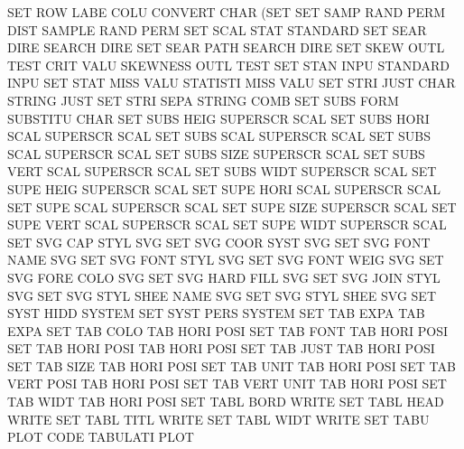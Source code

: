 SET      ROW  LABE COLU                 CONVERT  CHAR (SET
SET      SAMP RAND PERM DIST            SAMPLE   RAND PERM
SET      SCAL STAT                      STANDARD
SET      SEAR DIRE                      SEARCH   DIRE
SET      SEAR PATH                      SEARCH   DIRE
SET      SKEW OUTL TEST CRIT VALU       SKEWNESS OUTL TEST
SET      STAN INPU                      STANDARD INPU
SET      STAT MISS VALU                 STATISTI MISS VALU
SET      STRI JUST CHAR                 STRING   JUST
SET      STRI SEPA                      STRING   COMB
SET      SUBS FORM                      SUBSTITU CHAR
SET      SUBS HEIG                      SUPERSCR SCAL
SET      SUBS HORI SCAL                 SUPERSCR SCAL
SET      SUBS SCAL                      SUPERSCR SCAL
SET      SUBS SCAL                      SUPERSCR SCAL
SET      SUBS SIZE                      SUPERSCR SCAL
SET      SUBS VERT SCAL                 SUPERSCR SCAL
SET      SUBS WIDT                      SUPERSCR SCAL
SET      SUPE HEIG                      SUPERSCR SCAL
SET      SUPE HORI SCAL                 SUPERSCR SCAL
SET      SUPE SCAL                      SUPERSCR SCAL
SET      SUPE SIZE                      SUPERSCR SCAL
SET      SUPE VERT SCAL                 SUPERSCR SCAL
SET      SUPE WIDT                      SUPERSCR SCAL
SET      SVG  CAP  STYL                 SVG
SET      SVG  COOR SYST                 SVG
SET      SVG  FONT NAME                 SVG
SET      SVG  FONT STYL                 SVG
SET      SVG  FONT WEIG                 SVG
SET      SVG  FORE COLO                 SVG
SET      SVG  HARD FILL                 SVG
SET      SVG  JOIN STYL                 SVG
SET      SVG  STYL SHEE NAME            SVG
SET      SVG  STYL SHEE                 SVG
SET      SYST HIDD                      SYSTEM
SET      SYST PERS                      SYSTEM
SET      TAB  EXPA                      TAB      EXPA
SET      TAB  COLO                      TAB HORI POSI
SET      TAB  FONT                      TAB HORI POSI
SET      TAB  HORI POSI                 TAB HORI POSI
SET      TAB  JUST                      TAB HORI POSI
SET      TAB  SIZE                      TAB HORI POSI
SET      TAB  UNIT                      TAB HORI POSI
SET      TAB  VERT POSI                 TAB HORI POSI
SET      TAB  VERT UNIT                 TAB HORI POSI
SET      TAB  WIDT                      TAB HORI POSI
SET      TABL BORD                      WRITE
SET      TABL HEAD                      WRITE
SET      TABL TITL                      WRITE
SET      TABL WIDT                      WRITE
SET      TABU PLOT CODE                 TABULATI PLOT
